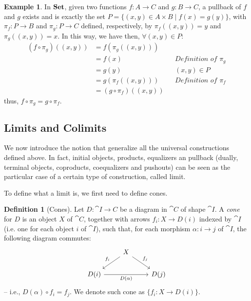\documentclass[a4paper, twoside,openright]{report}
\theoremstyle{plain}
\theoremstyle{definition}
\newtheorem{definition}[theorem]{Definition}
\newtheorem{example}[theorem]{Example}
\begin{document}
\begin{example}
    In $\mathbf{Set}$, given two functions $f: A \rightarrow C$ and $g: B \rightarrow C$, a pullback of $f$ and $g$ exists and is exactly the set $P = \{(x, y) \in A \times B \mid f(x) = g(y)\}$, with $\pi_f : P \rightarrow B$ and $\pi_g : P \rightarrow C$ defined, respectively, by $\pi_f((x, y)) = y$ and $\pi_g((x, y)) = x$. In this way, we have then, $\forall (x, y) \in P$:
    \begin{align*}
        (f \circ \pi_g) ((x, y))
                    &= f(\pi_g((x, y)))     &&  \\
                    & = f(x)                &&  \textit{Definition of $\pi_g$} \\
                    & = g(y)                &&  (x, y) \in P \\
                    & = g(\pi_f((x, y)))    &&  \textit{Definition of $\pi_f$} \\
                    & = (g \circ \pi_f) ((x, y)) && 
    \end{align*}
    thus, $f \circ \pi_g = g \circ \pi_f$.
\end{example}

\subsection{Limits and Colimits}

We now introduce the notion that generalize all the universal constructions defined above. In fact, initial objects, products, equalizers an pullback (dually, terminal objects, coproducts, coequalizers and pushouts) can be seen as the particular case of a certain type of construction, called limit.

To define what a limit is, we first need to define cones.

\begin{definition}[Cones]
    Let $D:\cat {I \rightarrow C}$ be a diagram in $\cat C$ of shape $\cat I$. A \emph{cone} for $D$ is an object $X$ of $\cat C$, together with arrows $f_i : X \rightarrow D(i)$ indexed by $\cat I$ (i.e. one for each object $i$ of $\cat I$), such that, for each morphism $\alpha: i \rightarrow j$ of $\cat I$, the following diagram commutes:
    \[
        \begin{tikzcd}
            & X \arrow[dl, "{f_i}"swap] \arrow[dr, "{f_j}"] & \\
            D(i) \arrow[rr, "{D(\alpha)}" swap] & & D(j)
        \end{tikzcd}
    \]
    -- i.e., $D(\alpha) \circ f_i = f_j$.
    We denote such cone as $\{f_i: X \rightarrow D(i)\}$.

\end{definition}
\end{document}
